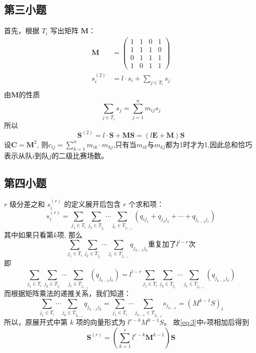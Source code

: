 \documentclass{ctexart}
\renewcommand{\S}{\mathbf{S}}
\newcommand{\M}{\mathbf{M}}
\begin{document}
\subsection{第三小题}
首先，根据 $T_i$ 写出矩阵 $\M$：
\begin{align*}
    \M &= \begin{pmatrix}
        1 & 1 & 0 & 1\\
        1 & 1 & 1 & 0\\
        0 & 1 & 1 & 1\\
        1 & 0 & 1 & 1
    \end{pmatrix}\\
    s_i^{(2)} &= l \cdot s_i + \sum_{j \in T_i} s_j\\
\end{align*}
由$\M$的性质
\[
    \sum_{j \in T_i} s_j = \sum_{j = 1}^{n} m_{ij}s_j
\]
所以
\[
\S^{(2)} = l \cdot \S + \M \S = (l\mathbf{E} + \M)\S
\]
设$\mathbf{C} = \M^2$, 则$c_{ij} = \sum_{k=1}^{n} m_{ik} \cdot m_{kj}$,只有当$m_{ik}$与$m_{kj}$都为1时才为1,因此总和恰巧表示从队$i$到队$j$的二级比赛场数。
\subsection{第四小题}
$r$ 级分差之和 $s_i^{(r)}$ 的定义展开后包含 $r$ 个求和项：
\begin{equation}
    s_i^{(r)} = \sum_{j_1 \in T_i} \sum_{j_2 \in T_{j_1}}\cdots\sum_{j_r \in T_{j_{r - 1}}}(q_{ij_1} + q_{j_1j_2} + \cdots + q_{j_{r - 1}j_r})
    \label{eq:3}
\end{equation}
其中如果只看第$k$项, 那么
\[
\sum_{j_1 \in T_i} \sum_{j_2 \in T_{j_1}}\cdots\sum_{j_r \in T_{j_{r - 1}}}q_{j_{k - 1}j_k}\text{重复加了}l^{l - r}\text{次}
\]
即
\[
\sum_{j_1 \in T_i} \sum_{j_2 \in T_{j_1}}\cdots\sum_{j_r \in T_{j_{r - 1}}}(q_{j_{k - 1}j_k}) = l^{l - r} \sum_{j_1 \in T_i} \sum_{j_2 \in T_{j_1}}\cdots\sum_{j_k \in T_{j_{k - 1}}}(q_{j_{k - 1}j_k})
\]
而根据矩阵乘法的递推关系，我们知道：
\[
\sum_{j_1 \in T_i} \cdots \sum_{j_k \in T_{j_{k-1}}} q_{j_{k-1}j_k} = \sum_{j_1 \in T_i} \cdots \sum_{j_{k-1} \in T_{j_{k-2}}} s_{j_{k-1}} = (M^{k-1}S)_i
\]
所以，原展开式中第 $k$ 项的向量形式为 $l^{r-k}M^{k-1}S$。
故\cref{eq:3}中$r$项相加后得到
\[
\S^{(r)} = (\sum_{k = 1}^{r}l^{r - k}\M^{k - 1})\S
\]
\end{document}
